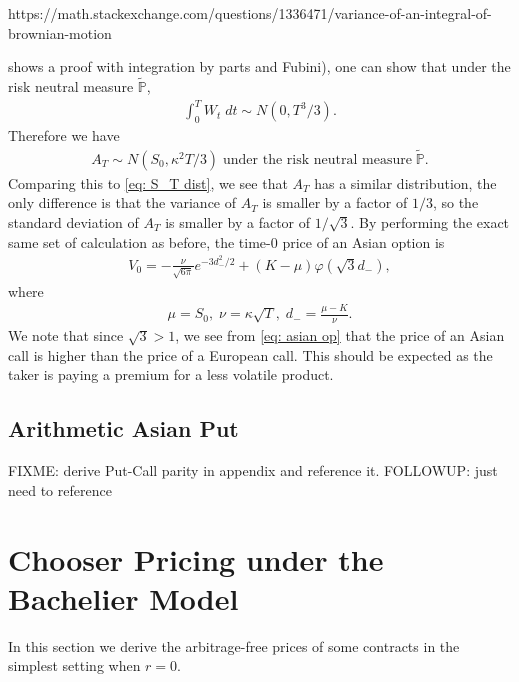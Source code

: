 \documentclass[reqno]{amsart}
\begin{document}
https://math.stackexchange.com/questions/1336471/variance-of-an-integral-of-brownian-motion 

shows a proof with integration by parts and Fubini), one can show that under the risk neutral measure $\tilde{\mathbb{P}}$, 
\begin{align}
	 \int_0^T W_t \; dt \sim N(0, T^3/3).
\end{align}
Therefore we have 
\begin{align}
	 A_T \sim N(S_0, \kappa^2 T/3) \; \text{under the risk neutral measure} \; \tilde{\mathbb{P}}.
\end{align}
Comparing this to \eqref{eq: S_T dist}, we see that $A_T$ has a similar distribution, the only difference is that the variance of $A_T$ is smaller by a factor of $1/3$, so the standard deviation of $A_T$ is smaller by a factor of $1/\sqrt{3}$. By performing the exact same set of calculation as before, the time-0 price of an Asian option is 
\begin{align} \label{eq: asian op}
	 V_0 = -\frac{\nu}{\sqrt{6\pi}} e^{-3d_-^2/2} + (K-\mu) \varphi(\sqrt{3}d_-),
\end{align}
where 
\begin{align}
	 \mu = S_0, \; \nu = \kappa \sqrt{T}, \; d_- = \frac{\mu - K}{\nu}.
\end{align}
We note that since $\sqrt{3} > 1$, we see from \eqref{eq: asian op} that the price of an Asian call is higher than the price of a European call. This should be expected as the taker is paying a premium for a less volatile product. 


\subsection{Arithmetic Asian Put}
FIXME: derive Put-Call parity in appendix and reference it.
FOLLOWUP: just need to reference

\section{Chooser Pricing under the Bachelier Model}
In this section we derive the arbitrage-free prices of some contracts in the simplest setting when $r = 0$.  
\end{document}
